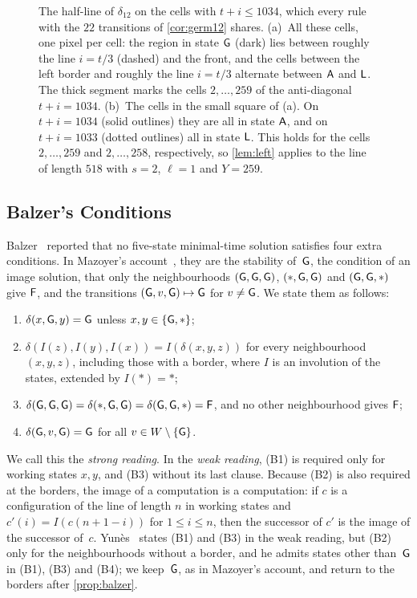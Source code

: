 \begin{figure}[t]
\centering

\caption{The half-line of $\delta_{12}$ on the cells with $t+i\le1034$, which
every rule with the $22$ transitions of \cref{cor:germ12} shares. (a)~All
these cells, one pixel per cell: the region in state $\mathsf G$ (dark) lies between
roughly the line $i=t/3$ (dashed) and the front, and the cells between the left
border and roughly the line $i=t/3$ alternate between $\mathsf A$ and $\mathsf L$. The thick
segment marks the cells $2,\dots,259$ of the anti-diagonal $t+i=1034$.
(b)~The cells in the small square of (a). On $t+i=1034$ (solid outlines) they
are all in state $\mathsf A$, and on $t+i=1033$ (dotted outlines) all in state $\mathsf L$.
This holds for the cells $2,\dots,259$ and $2,\dots,258$, respectively, so
\cref{lem:left} applies to the line of length $518$ with $s=2$, $\ell=1$ and
$Y=259$.}
\label{fig:delta12}
\end{figure}

\subsection{Balzer's Conditions}\label{sec:balzer}

Balzer~\cite{Balzer67} reported that no five-state minimal-time solution
satisfies four extra conditions. In Mazoyer's account~\cite[\S7]{Mazoyer86L},
they are the stability of~$\mathsf G$, the condition of an image solution, that only
the neighbourhoods $(\mathsf G,\mathsf G,\mathsf G)$, $(\ast,\mathsf G,\mathsf G)$ and $(\mathsf G,\mathsf G,\ast)$ give
$\mathsf F$, and the transitions $(\mathsf G,v,\mathsf G)\mapsto\mathsf G$ for $v\ne\mathsf G$. We state them
as follows:
\begin{enumerate}[(B1)]
\item $\delta(x,\mathsf G,y)=\mathsf G$ unless $x,y\in\{\mathsf G,\ast\}$;
\item $\delta(I(z),I(y),I(x))=I(\delta(x,y,z))$ for every neighbourhood
$(x,y,z)$, including those with a border, where $I$ is an involution of the
states, extended by $I(\ast)=\ast$;
\item $\delta(\mathsf G,\mathsf G,\mathsf G)=\delta(\ast,\mathsf G,\mathsf G)=\delta(\mathsf G,\mathsf G,\ast)=\mathsf F$, and no
other neighbourhood gives $\mathsf F$;
\item $\delta(\mathsf G,v,\mathsf G)=\mathsf G$ for all $v\in W\setminus\{\mathsf G\}$.
\end{enumerate}
We call this the \emph{strong reading}. In the \emph{weak reading}, (B1) is
required only for working states $x,y$, and (B3) without its last clause.
Because (B2) is also required at the borders, the image of a computation is a
computation: if $c$ is a configuration of the line of length $n$ in working
states and $c'(i)=I(c(n+1-i))$ for $1\le i\le n$, then the successor of $c'$ is
the image of the successor of~$c$.
Yun\`es~\cite[\S2.7]{Yunes93} states (B1) and (B3) in the weak reading, but
(B2) only for the neighbourhoods without a border, and he admits states other
than~$\mathsf G$ in (B1), (B3) and (B4); we keep~$\mathsf G$, as in Mazoyer's account, and
return to the borders after \cref{prop:balzer}.


